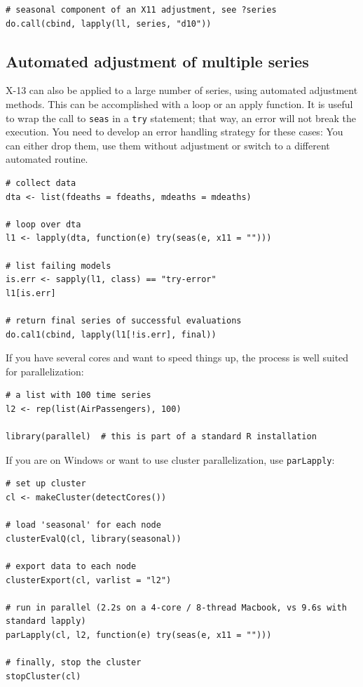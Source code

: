 \begin{verbatim}
# seasonal component of an X11 adjustment, see ?series
do.call(cbind, lapply(ll, series, "d10"))
\end{verbatim}

\subsection{Automated adjustment of multiple
series}\label{automated-adjustment-of-multiple-series}

X-13 can also be applied to a large number of series, using automated
adjustment methods. This can be accomplished with a loop or an apply
function. It is useful to wrap the call to \texttt{seas} in a
\texttt{try} statement; that way, an error will not break the execution.
You need to develop an error handling strategy for these cases: You can
either drop them, use them without adjustment or switch to a different
automated routine.

\begin{verbatim}
# collect data 
dta <- list(fdeaths = fdeaths, mdeaths = mdeaths)

# loop over dta
l1 <- lapply(dta, function(e) try(seas(e, x11 = "")))

# list failing models
is.err <- sapply(l1, class) == "try-error"
l1[is.err]

# return final series of successful evaluations
do.cal1(cbind, lapply(l1[!is.err], final))
\end{verbatim}

If you have several cores and want to speed things up, the process is
well suited for parallelization:

\begin{verbatim}
# a list with 100 time series
l2 <- rep(list(AirPassengers), 100)

library(parallel)  # this is part of a standard R installation
\end{verbatim}

If you are on Windows or want to use cluster parallelization, use
\texttt{parLapply}:

\begin{verbatim}
# set up cluster
cl <- makeCluster(detectCores())

# load 'seasonal' for each node
clusterEvalQ(cl, library(seasonal))

# export data to each node
clusterExport(cl, varlist = "l2")

# run in parallel (2.2s on a 4-core / 8-thread Macbook, vs 9.6s with standard lapply)
parLapply(cl, l2, function(e) try(seas(e, x11 = "")))

# finally, stop the cluster
stopCluster(cl)
\end{verbatim}

